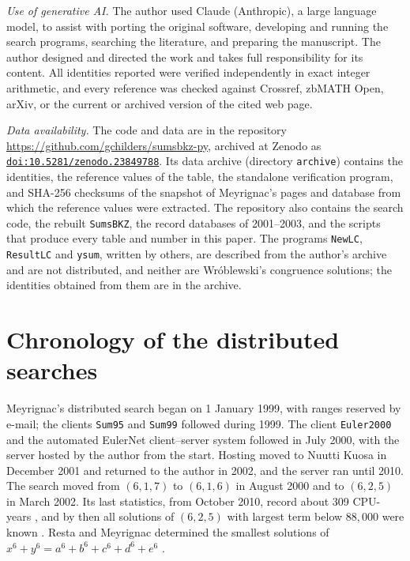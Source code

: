 \documentclass[11pt]{amsart}
\theoremstyle{definition}
\theoremstyle{remark}
\begin{document}
\medskip\noindent\textit{Use of generative AI.}
The author used Claude (Anthropic), a large language model, to assist with porting the original
software, developing and running the search programs, searching the literature, and
preparing the manuscript. The author designed and directed the work and takes full
responsibility for its content. All identities reported were verified independently in exact
integer arithmetic, and every reference was checked against Crossref, zbMATH Open, arXiv, or the
current or archived version of the cited web page.

\medskip\noindent\textit{Data availability.}
The code and data are in the repository \url{https://github.com/gchilders/sumsbkz-py}, archived
at Zenodo as \href{https://doi.org/10.5281/zenodo.23849788}{\nolinkurl{doi:10.5281/zenodo.23849788}}. Its
data archive (directory \texttt{archive}) contains the identities, the reference values of the
table, the standalone verification program, and SHA-256 checksums of the snapshot of
Meyrignac's pages and database from which the reference values were extracted. The repository
also contains the search code, the rebuilt \texttt{SumsBKZ}, the record databases of 2001--2003,
and the scripts that produce every table and number in this paper. The programs \texttt{NewLC}, \texttt{ResultLC} and \texttt{ysum}, written by others,
are described from the author's archive and are not distributed, and neither are
Wr\'oblewski's congruence solutions; the identities obtained from them are in the archive.

\appendix

\section{Chronology of the distributed searches}\label{app:chronology}
Meyrignac's distributed search began on 1 January 1999, with ranges reserved by e-mail; the
clients \texttt{Sum95} and \texttt{Sum99} followed during 1999. The client \texttt{Euler2000} and the automated EulerNet
client--server system followed in July 2000, with the server hosted by the author from the
start. Hosting moved to Nuutti Kuosa in December 2001 and returned to the author in 2002, and
the server ran until 2010. The search moved from $(6,1,7)$ to $(6,1,6)$ in August 2000 and to
$(6,2,5)$ in March 2002. Its last statistics, from October 2010, record about 309 CPU-years
\cite{MeyrignacEuler}, and by then all solutions of $(6,2,5)$ with largest term below $88{,}000$ were known
\cite{GerbiczMeyrignacBeckert2011}. Resta and Meyrignac determined the smallest solutions of
$x^6+y^6=a^6+b^6+c^6+d^6+e^6$ \cite{RestaMeyrignac2003}.
\end{document}
